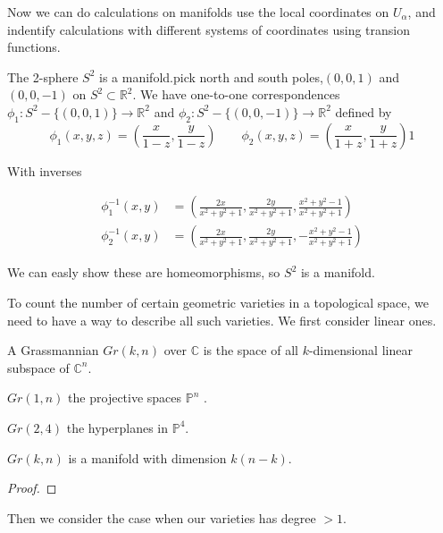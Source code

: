 \documentclass{article}
\begin{document}
Now we can do calculations on manifolds use the local coordinates on $U_{\alpha}$, 
and indentify calculations with different systems of coordinates using transion functions.

\begin{eg}
    The 2-sphere $S^{2}$ is a manifold.pick north and south poles,$(0,0,1)$ 
    and $(0,0,-1)$ on $S^{2} \subset \mathbb{R}^{2}$. We have one-to-one correspondences
    $\phi_{1} : S^{2}- \{(0,0,1)\} \longrightarrow \mathbb{R}^{2} $ and 
    $\phi_{2} : S^{2}- \{(0,0,-1)\} \longrightarrow \mathbb{R}^{2}$ defined by\\
    
    \[
    \phi_{1}(x,y,z) = (\frac{x}{1-z},\frac{y}{1-z}) \qquad 
    \phi_{2}(x,y,z) = (\frac{x}{1+z},\frac{y}{1+z})1
    \]

    With inverses
    
    \begin{align*}
    \phi_{1}^{-1}(x,y) & = {}(\frac{2x}{x^{2}+y^{2}+1},\frac{2y}{x^{2}+y^{2}+1},\frac{x^{2}+y^{2}-1}{x^{2}+y^{2}+1}) \\
    \phi_{2}^{-1}(x,y) & = {}(\frac{2x}{x^{2}+y^{2}+1},\frac{2y}{x^{2}+y^{2}+1},-\frac{x^{2}+y^{2}-1}{x^{2}+y^{2}+1})
    \end{align*}
 
    We can easly show these are homeomorphisms, so $S^{2}$ is a manifold.
\end{eg}


To count the number of certain geometric varieties in a topological space, we need to have a way to describe 
all such varieties. We first consider linear ones.
\begin{df}
A Grassmannian $Gr(k,n)$ over $\mathbb{C}$ is the space of all $k$-dimensional 
linear subspace of $\mathbb{C}^{n}$. 
\end{df}

\begin{eg}
$Gr(1,n)$ the projective spaces $\mathbb{P}^{n}$ .
\end{eg}

\begin{eg}
$Gr(2,4)$ the hyperplanes in $\mathbb{P}^{4}$.
\end{eg}

\begin{thm}
$Gr(k,n)$ is a manifold with dimension $k(n-k) $. 
\end{thm}
\begin{proof}

\end{proof}
Then we consider the case when our varieties has degree $> 1$.
\end{document}
